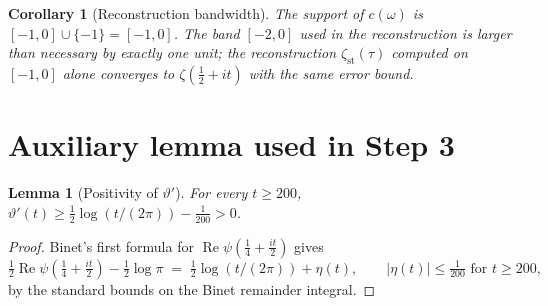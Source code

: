 \documentclass[11pt]{article}
\newtheorem{corollary}{Corollary}
\newtheorem{lemma}{Lemma}
\DeclareMathOperator{\ReOp}{Re}
\let\Re\ReOp
\begin{document}
\begin{corollary}[Reconstruction bandwidth]
The support of $c(\omega)$ is $[-1,0]\cup\{-1\} = [-1,0]$. The band $[-2,0]$ used in the reconstruction is larger than necessary by exactly one unit; the reconstruction $\zeta_{\mathrm{st}}(\tau)$ computed on $[-1,0]$ alone converges to $\zeta(\tfrac12+it)$ with the same error bound.
\end{corollary}

\section*{Auxiliary lemma used in Step 3}

\begin{lemma}[Positivity of $\vartheta'$]
For every $t\ge 200$, $\vartheta'(t) \ge \tfrac12\log(t/(2\pi)) - \tfrac{1}{200} > 0$.
\end{lemma}

\begin{proof}
Binet's first formula for $\Re\psi(\tfrac14+\tfrac{it}{2})$ gives
\[
  \tfrac12\Re\psi(\tfrac14+\tfrac{it}{2}) - \tfrac12\log\pi
  \;=\; \tfrac12\log(t/(2\pi)) + \eta(t), \qquad |\eta(t)|\le \tfrac{1}{200} \text{ for } t\ge 200,
\]
by the standard bounds on the Binet remainder integral.
\end{proof}
\end{document}
